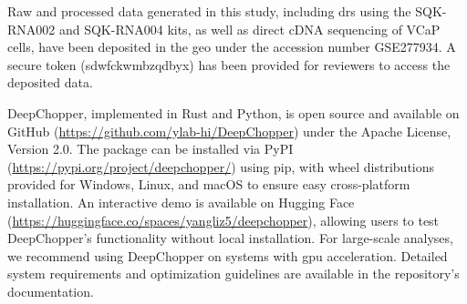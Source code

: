\documentclass[pdflatex,sn-nature, lineno]{sn-jnl}%
\begin{document}



Raw and processed data generated in this study, including \gls{drs} using the SQK-RNA002 and SQK-RNA004 kits, as well as direct cDNA sequencing of VCaP cells, have been deposited in the \gls{geo} under the accession number GSE277934.
A secure token (sdwfckwmbzqdbyx) has been provided for reviewers to access the deposited data.


DeepChopper, implemented in Rust and Python, is open source and available on GitHub (\url{https://github.com/ylab-hi/DeepChopper}) under the Apache License, Version 2.0.
The package can be installed via PyPI (\url{https://pypi.org/project/deepchopper/}) using pip, with wheel distributions provided for Windows, Linux, and macOS to ensure easy cross-platform installation.
An interactive demo is available on Hugging Face (\url{https://huggingface.co/spaces/yangliz5/deepchopper}), allowing users to test DeepChopper's functionality without local installation.
For large-scale analyses, we recommend using DeepChopper on systems with \gls{gpu} acceleration. Detailed system requirements and optimization guidelines are available in the repository's documentation.
\end{document}
